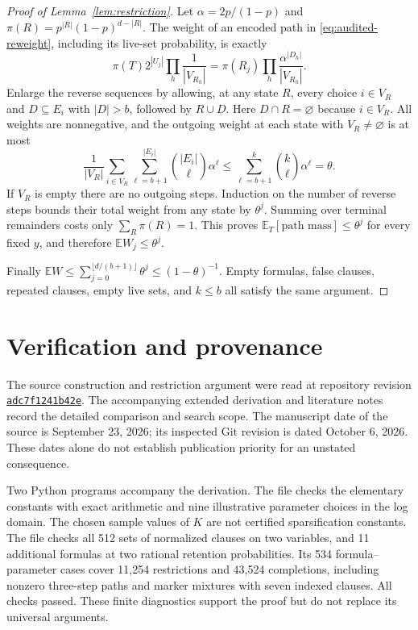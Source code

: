 \documentclass[11pt,letterpaper]{article}
\theoremstyle{definition}
\numberwithin{equation}{section}
\newcommand{\E}{\mathbb E}
\begin{document}
\begin{proof}[Proof of Lemma~\ref{lem:restriction}]
Let $\alpha=2p/(1-p)$ and
$\pi(R)=p^{|R|}(1-p)^{d-|R|}$. The weight of an encoded path in
\eqref{eq:audited-reweight}, including its live-set probability, is exactly
\[
 \pi(T)2^{|U_j|}\prod_h\frac1{|V_{R_h}|}
   =\pi(R_j)\prod_h\frac{\alpha^{|D_h|}}{|V_{R_h}|}.
\]
Enlarge the reverse sequences by allowing, at any state $R$, every choice
$i\in V_R$ and $D\subseteq E_i$ with $|D|>b$, followed by $R\cup D$.
Here $D\cap R=\varnothing$ because $i\in V_R$.
All weights are nonnegative, and the outgoing weight at each state with
$V_R\ne\varnothing$ is at most
\[
 \frac1{|V_R|}\sum_{i\in V_R}
          \sum_{\ell=b+1}^{|E_i|}\binom{|E_i|}{\ell}\alpha^\ell
 \le\sum_{\ell=b+1}^k\binom{k}{\ell}\alpha^\ell=\theta.
\]
If $V_R$ is empty there are no outgoing steps. Induction on the number
of reverse steps bounds their total weight from any state by $\theta^j$.
Summing over terminal remainders costs only
$\sum_R\pi(R)=1$. This proves $\E_T[\text{path mass}]\le\theta^j$ for every fixed $y$, and
therefore $\E W_j\le\theta^j$.

Finally $\E W\le\sum_{j=0}^{\lfloor d/(b+1)\rfloor}\theta^j
\le(1-\theta)^{-1}$. Empty formulas, false clauses, repeated clauses,
empty live sets, and $k\le b$ all satisfy the same argument.
\end{proof}


\section{Verification and provenance}\label{app:verification}
The source construction and restriction argument were read at repository
revision \href{https://github.com/openai/math/commit/adc7f1241b42e322a6451854ab7e4b4c146bf78a}{\texttt{adc7f1241b42e}}. The accompanying
extended derivation and literature notes record the detailed comparison and search scope.
The manuscript date of the source is September 23, 2026; its inspected Git
revision is dated October 6, 2026. These dates alone do not establish
publication priority for an unstated consequence.

Two Python programs accompany the derivation. The file
 checks the elementary constants
with exact arithmetic and nine illustrative parameter choices in the log
domain. The chosen sample values of $K$ are not certified sparsification
constants. The file  checks all 512
sets of normalized clauses on two variables, and 11 additional formulas
at two rational retention probabilities. Its 534 formula--parameter cases
cover 11,254 restrictions and 43,524 completions, including nonzero
three-step paths and marker mixtures with seven indexed clauses.
All checks passed. These finite diagnostics support the proof but do not
replace its universal arguments.
\end{document}
